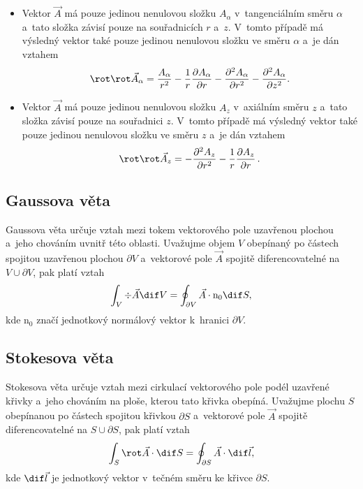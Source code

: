 \begin{itemize}
\item Vektor $\vec A$ má pouze jedinou nenulovou složku $A_\alpha$ v~tangenciálním směru $\alpha$ a~tato složka závisí pouze na souřadnicích $r$ a~$z$. V~tomto případě má výsledný vektor také pouze jedinou nenulovou složku ve směru $\alpha$ a~je dán vztahem
$$
\rot \rot \vec A_\alpha =
\frac{A_\alpha}{r^2}-\frac{1}{r}\frac{\partial A_\alpha}{\partial r}-
\frac{\partial^2 A_\alpha}{\partial r^2}-\frac{\partial^2 A_\alpha}{\partial z^2}.
$$
\item Vektor $\vec A$ má pouze jedinou nenulovou složku $A_z$ v~axiálním směru $z$ a~tato složka závisí pouze na souřadnici $z$. V~tomto případě má výsledný vektor také pouze jedinou nenulovou složku ve směru $z$ a~je dán vztahem
$$
\rot \rot \vec A_z=-\frac{\partial^2 A_z}{\partial r^2}-
\frac{1}{r}\frac{\partial A_z}{\partial r}\,.
$$
\end{itemize}

\subsection*{Gaussova věta}

Gaussova věta určuje vztah mezi tokem vektorového pole uzavřenou plochou a~jeho chováním uvnitř této oblasti. Uvažujme objem $V$ obepínaný po částech spojitou uzavřenou plochou $\partial V$ a~vektorové pole $\vec A$ spojitě diferencovatelné na $V \cup \partial V$, pak platí vztah
$$
\int_V \div \vec A \dif V = \oint_{\partial V} \vec A \cdot \mathrm{n}_\mathrm{0} \dif S,
$$
kde $\mathrm{n}_\mathrm{0}$ značí jednotkový normálový vektor k~hranici $\partial V$. 

\subsection*{Stokesova věta}

Stokesova věta určuje vztah mezi cirkulací vektorového pole podél uzavřené křivky a~jeho chováním na ploše, kterou tato křivka obepíná. Uvažujme plochu $S$ obepínanou po částech spojitou křivkou $\partial S$ a~vektorové pole $\vec A$ spojitě diferencovatelné na $S \cup \partial S$, pak platí vztah
$$
\int_S \rot \vec A \cdot \dif S = \oint_{\partial S} \vec A \cdot \dif \vec l,
$$
kde $\dif \vec l$ je jednotkový vektor v~tečném směru ke křivce $\partial S$.




































